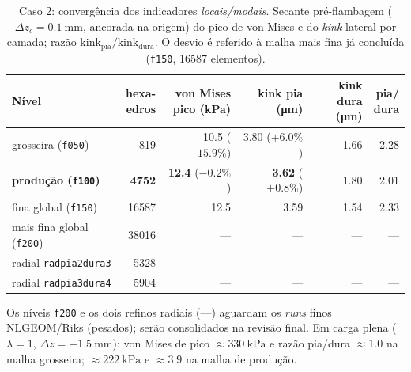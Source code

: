 \begin{table}[h!]
\centering
\small
\caption{Caso 2: convergência dos indicadores \emph{locais/modais}. Secante
pré-flambagem ($\Delta z_c = \SI{0.1}{\milli\meter}$, ancorada na origem) do pico
de von Mises e do \emph{kink} lateral por camada; razão $\mathrm{kink}_{\mathrm{pia}}/\mathrm{kink}_{\mathrm{dura}}$.
O desvio é referido à malha mais fina já concluída (\texttt{f150}, \num{16587}
elementos).}
\label{tab:res-malha-local}
\begin{tabular}{l r r r r r}
\toprule
\textbf{Nível} & \makecell{hexa-\\edros} & \makecell{von Mises\\pico (\si{\kilo\pascal})} &
\makecell{kink pia\\(\si{\micro\meter})} & \makecell{kink dura\\(\si{\micro\meter})} &
\makecell{pia/\\dura} \\
\midrule
grosseira (\texttt{f050})         & 819   & 10.5 ($-15.9\%$) & 3.80 ($+6.0\%$) & 1.66 & 2.28 \\
\textbf{produção (\texttt{f100})} & \textbf{4752} & \textbf{12.4} ($-0.2\%$) & \textbf{3.62} ($+0.8\%$) & 1.80 & 2.01 \\
fina global (\texttt{f150})       & 16587 & 12.5             & 3.59            & 1.54 & 2.33 \\
mais fina global (\texttt{f200})  & 38016 & ---              & ---             & ---  & ---  \\
radial \texttt{radpia2dura3}      & 5328  & ---              & ---             & ---  & ---  \\
radial \texttt{radpia3dura4}      & 5904  & ---              & ---             & ---  & ---  \\
\bottomrule
\end{tabular}

\smallskip
{\footnotesize Os níveis \texttt{f200} e os dois refinos radiais (---) aguardam
os \emph{runs} finos NLGEOM/Riks (pesados); serão consolidados na revisão final.
Em carga plena ($\lambda = 1$, $\Delta z = -\SI{1.5}{\milli\meter}$): von Mises de
pico $\approx \SI{330}{\kilo\pascal}$ e razão pia/dura $\approx 1.0$ na malha
grosseira; $\approx \SI{222}{\kilo\pascal}$ e $\approx 3.9$ na malha de produção.}
\end{table}

